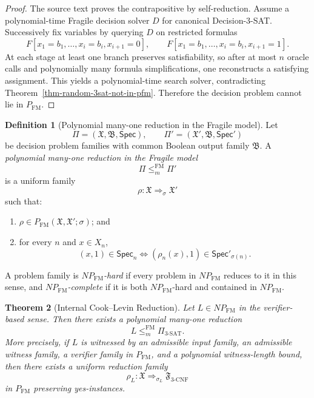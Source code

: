 \documentclass[11pt]{article}
\newtheorem{theorem}{Theorem}[section]
\theoremstyle{definition}
\newtheorem{definition}[theorem]{Definition}
\theoremstyle{remark}
\newcommand{\FM}{\mathrm{FM}}
\newcommand{\NPFM}{NP_{\mathrm{FM}}}
\newcommand{\Spec}{\mathsf{Spec}}
\begin{document}
\begin{proof}
The source text proves the contrapositive by self-reduction. Assume a polynomial-time Fragile decision solver $D$ for canonical Decision-3-SAT. Successively fix variables by querying $D$ on restricted formulas
\[
F[x_1 = b_1, \dots, x_i = b_i, x_{i+1} = 0],
\qquad
F[x_1 = b_1, \dots, x_i = b_i, x_{i+1} = 1].
\]
At each stage at least one branch preserves satisfiability, so after at most $n$ oracle calls and polynomially many formula simplifications, one reconstructs a satisfying assignment. This yields a polynomial-time search solver, contradicting Theorem~\ref{thm-random-3sat-not-in-pfm}. Therefore the decision problem cannot lie in $P_{\FM}$.
\end{proof}

\begin{definition}[Polynomial many-one reduction in the Fragile model]\label{def-poly-many-one-reduction-fm}
Let
\[
\Pi = (\mathfrak X, \mathfrak B, \Spec),
\qquad
\Pi' = (\mathfrak X', \mathfrak B, \Spec')
\]
be decision problem families with common Boolean output family $\mathfrak B$. A \emph{polynomial many-one reduction in the Fragile model}
\[
\Pi \le_m^{\FM} \Pi'
\]
is a uniform family
\[
\rho : \mathfrak X \Rightarrow_{\sigma} \mathfrak X'
\]
such that:
\begin{enumerate}
\item $\rho \in P_{\FM}(\mathfrak X, \mathfrak X'; \sigma)$; and
\item for every $n$ and $x \in X_n$,
\[
(x,1) \in \Spec_n
\iff
(\rho_n(x),1) \in \Spec'_{\sigma(n)}.
\]
\end{enumerate}
A problem family is \emph{$NP_{\FM}$-hard} if every problem in $\NPFM$ reduces to it in this sense, and \emph{$NP_{\FM}$-complete} if it is both $NP_{\FM}$-hard and contained in $\NPFM$.
\end{definition}

\begin{theorem}[Internal Cook--Levin Reduction]\label{thm-internal-cook-levin-reduction}
Let $L \in \NPFM$ in the verifier-based sense. Then there exists a polynomial many-one reduction
\[
L \le_m^{\FM} \Pi_{3\text{-SAT}}.
\]
More precisely, if $L$ is witnessed by an admissible input family, an admissible witness family, a verifier family in $P_{\FM}$, and a polynomial witness-length bound, then there exists a uniform reduction family
\[
\rho_L : \mathfrak X \Rightarrow_{\sigma_L} \mathfrak F_{3\text{-CNF}}
\]
in $P_{\FM}$ preserving yes-instances.
\end{theorem}
\end{document}
